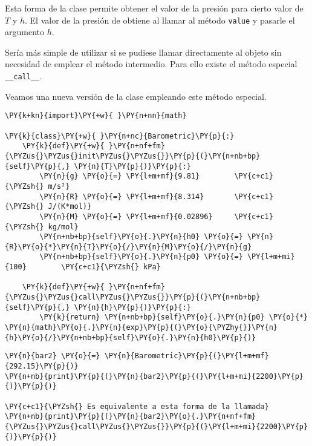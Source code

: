 Esta forma de la clase permite obtener el valor de la presión para
cierto valor de \(T\) y \(h\). El valor de la presión de obtiene al
llamar al método \texttt{value} y pasarle el argumento \(h\).

Sería más simple de utilizar si se pudiese llamar directamente al objeto
sin necesidad de emplear el método intermedio. Para ello existe el
método especial \texttt{\_\_call\_\_}.

Veamos una nueva versión de la clase empleando este método especial.

\begin{tcolorbox}[breakable, size=fbox, boxrule=1pt, pad at break*=1mm,colback=cellbackground, colframe=cellborder]
\begin{Verbatim}[commandchars=\\\{\}]
\PY{k+kn}{import}\PY{+w}{ }\PY{n+nn}{math} 

\PY{k}{class}\PY{+w}{ }\PY{n+nc}{Barometric}\PY{p}{:}
    \PY{k}{def}\PY{+w}{ }\PY{n+nf+fm}{\PYZus{}\PYZus{}init\PYZus{}\PYZus{}}\PY{p}{(}\PY{n+nb+bp}{self}\PY{p}{,} \PY{n}{T}\PY{p}{)}\PY{p}{:}
        \PY{n}{g} \PY{o}{=} \PY{l+m+mf}{9.81}        \PY{c+c1}{\PYZsh{} m/s²}
        \PY{n}{R} \PY{o}{=} \PY{l+m+mf}{8.314}       \PY{c+c1}{\PYZsh{} J/(K*mol)}
        \PY{n}{M} \PY{o}{=} \PY{l+m+mf}{0.02896}     \PY{c+c1}{\PYZsh{} kg/mol}
        \PY{n+nb+bp}{self}\PY{o}{.}\PY{n}{h0} \PY{o}{=} \PY{n}{R}\PY{o}{*}\PY{n}{T}\PY{o}{/}\PY{n}{M}\PY{o}{/}\PY{n}{g}
        \PY{n+nb+bp}{self}\PY{o}{.}\PY{n}{p0} \PY{o}{=} \PY{l+m+mi}{100}        \PY{c+c1}{\PYZsh{} kPa}

    \PY{k}{def}\PY{+w}{ }\PY{n+nf+fm}{\PYZus{}\PYZus{}call\PYZus{}\PYZus{}}\PY{p}{(}\PY{n+nb+bp}{self}\PY{p}{,} \PY{n}{h}\PY{p}{)}\PY{p}{:}
        \PY{k}{return} \PY{n+nb+bp}{self}\PY{o}{.}\PY{n}{p0} \PY{o}{*} \PY{n}{math}\PY{o}{.}\PY{n}{exp}\PY{p}{(}\PY{o}{\PYZhy{}}\PY{n}{h}\PY{o}{/}\PY{n+nb+bp}{self}\PY{o}{.}\PY{n}{h0}\PY{p}{)}
\end{Verbatim}
\end{tcolorbox}

    \begin{tcolorbox}[breakable, size=fbox, boxrule=1pt, pad at break*=1mm,colback=cellbackground, colframe=cellborder]
\begin{Verbatim}[commandchars=\\\{\}]
\PY{n}{bar2} \PY{o}{=} \PY{n}{Barometric}\PY{p}{(}\PY{l+m+mf}{292.15}\PY{p}{)}
\PY{n+nb}{print}\PY{p}{(}\PY{n}{bar2}\PY{p}{(}\PY{l+m+mi}{2200}\PY{p}{)}\PY{p}{)}

\PY{c+c1}{\PYZsh{} Es equivalente a esta forma de la llamada}
\PY{n+nb}{print}\PY{p}{(}\PY{n}{bar2}\PY{o}{.}\PY{n+nf+fm}{\PYZus{}\PYZus{}call\PYZus{}\PYZus{}}\PY{p}{(}\PY{l+m+mi}{2200}\PY{p}{)}\PY{p}{)}
\end{Verbatim}
\end{tcolorbox}

